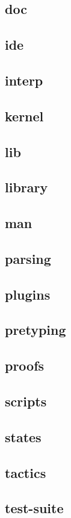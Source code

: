 \documentclass[a4paper,oneside]{book}
\begin{document}
\subsection{doc}
\subsection{ide}
\subsection{interp}
\subsection{kernel}
\subsection{lib}
\subsection{library}
\subsection{man}
\subsection{parsing}
\subsection{plugins}
\subsection{pretyping}
\subsection{proofs}
\subsection{scripts}
\subsection{states}
\subsection{tactics}
\subsection{test-suite}
\end{document}
